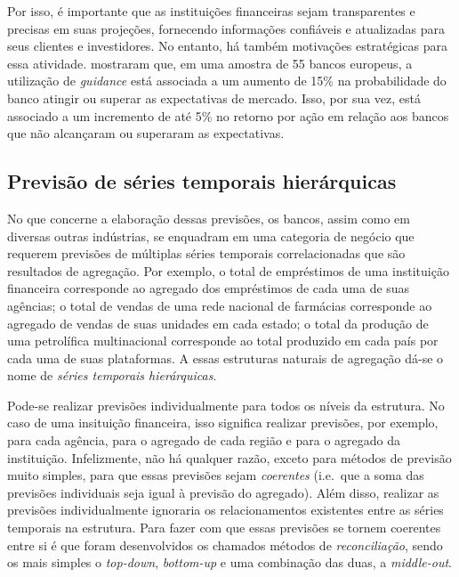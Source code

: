 \documentclass[
  12pt,
  twoside,
  openright,
  a4paper,
  chapter=TITLE,
  section=TITLE,
  brazil]{abntex2}
\begin{document}
Por isso, é importante que as instituições financeiras sejam
transparentes e precisas em suas projeções, fornecendo informações
confiáveis e atualizadas para seus clientes e investidores. No entanto,
há também motivações estratégicas para essa atividade.
\textcite{beccalli_earnings_2015} mostraram que, em uma amostra de 55
bancos europeus, a utilização de \emph{guidance} está associada a um
aumento de 15\% na probabilidade do banco atingir ou superar as
expectativas de mercado. Isso, por sua vez, está associado a um
incremento de até 5\% no retorno por ação em relação aos bancos que não
alcançaram ou superaram as expectativas.

\subsection{Previsão de séries temporais
hierárquicas}\label{previsuxe3o-de-suxe9ries-temporais-hieruxe1rquicas}

No que concerne a elaboração dessas previsões, os bancos, assim como em
diversas outras indústrias, se enquadram em uma categoria de negócio que
requerem previsões de múltiplas séries temporais correlacionadas que são
resultados de agregação. Por exemplo, o total de empréstimos de uma
instituição financeira corresponde ao agregado dos empréstimos de cada
uma de suas agências; o total de vendas de uma rede nacional de
farmácias corresponde ao agregado de vendas de suas unidades em cada
estado; o total da produção de uma petrolífica multinacional corresponde
ao total produzido em cada país por cada uma de suas plataformas. A
essas estruturas naturais de agregação dá-se o nome de \emph{séries
temporais hierárquicas}.

Pode-se realizar previsões individualmente para todos os níveis da
estrutura. No caso de uma insituição financeira, isso significa realizar
previsões, por exemplo, para cada agência, para o agregado de cada
região e para o agregado da instituição. Infelizmente, não há qualquer
razão, exceto para métodos de previsão muito simples, para que essas
previsões sejam \emph{coerentes} (i.e.~que a soma das previsões
individuais seja igual à previsão do agregado). Além disso, realizar as
previsões individualmente ignoraria os relacionamentos existentes entre
as séries temporais na estrutura. Para fazer com que essas previsões se
tornem coerentes entre si é que foram desenvolvidos os chamados métodos
de \emph{reconciliação}, sendo os mais simples o \emph{top-down},
\emph{bottom-up} e uma combinação das duas, a \emph{middle-out}.
\end{document}

